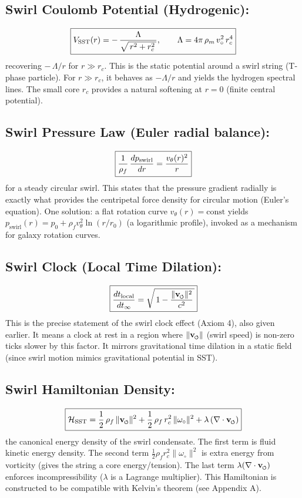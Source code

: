 \documentclass[reprint,aps,onecolumn,nofootinbib]{revtex4-2}
\newcommand{\swirlarrow}{%
    \mathchoice{\mkern-2mu\scriptstyle\boldsymbol{\circlearrowleft}}%
    {\mkern-2mu\scriptstyle\boldsymbol{\circlearrowleft}}%
    {\mkern-2mu\scriptscriptstyle\boldsymbol{\circlearrowleft}}%
    {\mkern-2mu\scriptscriptstyle\boldsymbol{\circlearrowleft}}%
}
\newcommand{\vswirl}{\mathbf{v}_{\swirlarrow}}
\begin{document}
        \subsection{Swirl Coulomb Potential (Hydrogenic):}
            \[
                \boxed{%
                    V_{\text{SST}}(r) = -\,\frac{\Lambda}{\sqrt{\,r^2 + r_c^2\,}}, \qquad
                    \Lambda = 4\pi\,\rho_m\,v_{\circ}^2\,r_c^4
                }
            \]
            recovering $-\,\Lambda/r$ for $r \gg r_c$. This is the static potential around a swirl string (T-phase particle). For $r \gg r_c$, it behaves as $-\Lambda/r$ and yields the hydrogen spectral lines. The small core $r_c$ provides a natural softening at $r=0$ (finite central potential).

        \subsection{Swirl Pressure Law (Euler radial balance):}
            \[
                \boxed{%
                    \frac{1}{\rho_f}\,\frac{d p_{\text{swirl}}}{dr} = \frac{v_{\theta}(r)^2}{r}
                }
            \]
            for a steady circular swirl. This states that the pressure gradient radially is exactly what provides the centripetal force density for circular motion (Euler’s equation). One solution: a flat rotation curve $v_{\theta}(r)=\text{const}$ yields $p_{\text{swirl}}(r) = p_0 + \rho_f v_{\theta}^2 \ln(r/r_0)$ (a logarithmic profile), invoked as a mechanism for galaxy rotation curves.

        \subsection{Swirl Clock (Local Time Dilation):}
            \[
                \boxed{%
                    \frac{dt_{\text{local}}}{dt_{\infty}} = \sqrt{\,1 - \frac{\|\vswirl\|^2}{c^2}\,}
                }
            \]
            This is the precise statement of the swirl clock effect (Axiom 4), also given earlier. It means a clock at rest in a region where $\|\vswirl\|$ (swirl speed) is non-zero ticks slower by this factor. It mirrors gravitational time dilation in a static field (since swirl motion mimics gravitational potential in SST).

        \subsection{Swirl Hamiltonian Density:}
            \[
                \boxed{%
                    \mathcal{H}_{\text{SST}} =
                    \frac{1}{2}\,\rho_f\,\|\vswirl\|^2 +
                    \frac{1}{2}\,\rho_f\,r_c^2\,\|\omega_{\circ}\|^2 +
                    \lambda\,(\nabla \cdot \vswirl)
                }
            \]
            the canonical energy density of the swirl condensate. The first term is fluid kinetic energy density. The second term $\frac{1}{2}\rho_f r_c^2 \|\omega_{\circ}\|^2$ is extra energy from vorticity (gives the string a core energy/tension). The last term $\lambda(\nabla\cdot\vswirl)$ enforces incompressibility ($\lambda$ is a Lagrange multiplier). This Hamiltonian is constructed to be compatible with Kelvin’s theorem (see Appendix A).
\end{document}
